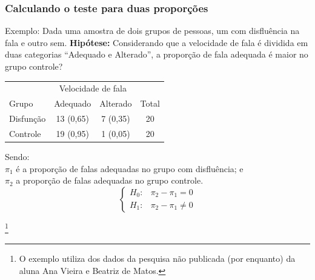 \documentclass[graphics,14pt]{beamer}
\newcommand{\lfr}[1]{\let\thefootnote\relax\footnote{\hspace{0.6cm}\vspace{1.25cm} #1}}
\begin{document}
\begin{frame}[t,fragile=singleslide]
	\frametitle{Calculando o teste para duas proporções}

	Exemplo: Dada uma amostra de dois grupos de pessoas, um com disfluência na fala e outro sem. 
	\textbf{Hipótese:} Considerando que a velocidade de fala é dividida em duas categorias ``Adequado e Alterado'', a proporção de fala adequada é maior no grupo controle?
	
	\begin{table}[]
		\centering
		\begin{tabular}{lccc}
			& \multicolumn{2}{c}{Velocidade de fala} &       \\ \cline{2-3}
			Grupo     & Adequado           & Alterado          & Total \\ \hline
			Disfunção & 13 (0,65)          & 7 (0,35)          & 20    \\
			Controle  & 19 (0,95)          & 1 (0,05)          & 20   
		\end{tabular}
	\end{table}

	Sendo:\\
	$\pi_1$ é a proporção de falas adequadas no grupo com disfluência; e \\
	$\pi_2$ a proporção de falas adequadas no grupo controle. \\
	
	\begin{equation*}
	\left\{ \begin{array}{cl}
	H_0: & \pi_2 - \pi_1 = 0 \\
	H_1: & \pi_2 - \pi_1 \neq 0
	\end{array}\right.
	\end{equation*}

	\lfr{O exemplo utiliza dos dados da pesquisa não publicada (por enquanto) da aluna Ana Vieira e Beatriz de Matos.}

\end{frame}	
\end{document}
